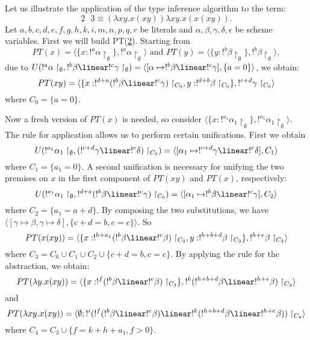 \begin{exa}
  Let us illustrate the application of the type inference algorithm to
  the term:
$$\underline{2}\mbox{ }\underline{3}\equiv (\lambda xy. x(xy))\lambda
xy.x(x(xy)).
$$ 
  Let $a,b,c,d,e,f,g,h,k,i,m,n,p,q,r$ be literals and $\alpha,
  \beta,\gamma, \delta,\epsilon$ be scheme variables.  First we will
  build PT(\underline{2}). Starting from
$$PT(x)=\langle \{x:!^{a}\alpha\restriction_{\emptyset}\},!^{a}\alpha\restriction_{\emptyset} \rangle 
\mbox{ and } PT(y)=\langle
\{y:!^{b}\beta\restriction_{\emptyset}\},!^{b}\beta\restriction_{\emptyset}
\rangle,
$$
  due to $U(!^{a}\alpha\restriction_{\emptyset},!^{b}\beta \linear
  !^{c}\gamma\restriction_{\emptyset})=\langle [\alpha \mapsto
  !^{b}\beta \linear !^{c}\gamma ], \{a=0\} \rangle$, we obtain:
$$PT(xy)=\langle \{x:!^{d+a}(!^{b}\beta \linear !^{c}\gamma)\restriction_{C_{0}}, y:!^{d+b}\beta\restriction_{C_{0}}\}, 
!^{c+d}\gamma\restriction_{C_{0}}\rangle
$$ 
  where $C_{0}=\{a=0\}$.

  Now a fresh version of $PT(x)$ is needed, so consider $\langle
  \{x:!^{a_{1}}\alpha_{1}\restriction_{\emptyset}\},!^{a_{1}}\alpha_{1}
  \restriction_{\emptyset} \rangle$.  The rule for application allows
  us to perform certain unifications.  First we obtain
$$U(!^{a_{1}}\alpha_{1}\restriction_{\emptyset}, (!^{c+d}\gamma \linear !^{e} \delta)\restriction_{C_{0}})=
\langle [\alpha_{1}\mapsto !^{c+d}\gamma \linear !^{e} \delta],
C_{1}\rangle
$$ 
  where $C_{1}=\{a_{1}=0 \}$.  A second unification is
  necessary for unifying the two premises on $x$ in the first
  component of $PT(xy)$ and $PT(x)$, respectively:
$$U(!^{a_{1}}\alpha_{1}\restriction_{\emptyset}, !^{d+a}(!^{b}\beta \linear !^{c}\gamma)\restriction_{C_{0}})=
\langle [\alpha_{1}\mapsto !^{b}\beta \linear !^{c}\gamma], C_{2}
\rangle
$$ 
  where $C_{2}= \{a_{1}=a+d\} $.  By composing the two substitutions,
  we have $\langle [\gamma \mapsto \beta, \gamma \mapsto \delta],
  \{c+d=b, e=c \}\rangle$.  So 
$$PT(x(xy))=\langle
  \{x:!^{h+a_{1}}(!^{b }\beta \linear !^{e}\beta)\restriction_{C_{3}},
  y:!^{h+b+d}\beta\restriction_{C_{3}}\}, !^{h+e }\beta
  \restriction_{C_{3}} \rangle
$$
  where $C_{3}=C_{0}\cup C_{1}\cup C_{2}\cup \{c+d=b, c=e\}.$ By
  applying the rule for the abstraction, we obtain:
$$PT(\lambda y.x(xy))=\langle \{x:!^{f}(!^{b }\beta \linear !^{e}\beta)\restriction_{C_{3}}\}, !^{k}(!^{h+b+d}\beta \linear
!^{h+e} \beta)\restriction_{C_{3}}   \rangle
$$
  and
$$PT(\lambda xy.x(xy)) = \langle\emptyset; !^{i}(!^{f}(!^{b}\beta \linear !^{e}\beta)\linear !^{k}(!^{h+b+d}\beta \linear
!^{h+e} \beta))\restriction_{C_{4}}   \rangle
$$
  where $C_{4}=C_{3}\cup \{f=k+h+a_{1}, f>0\}$.


\end{exa}
